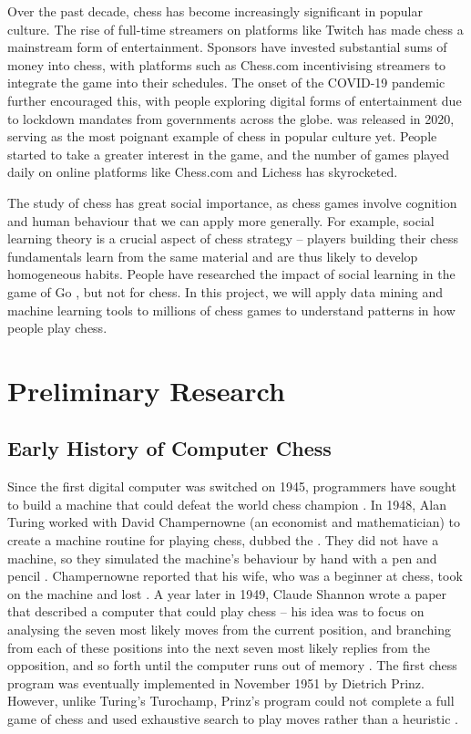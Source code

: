 \documentclass[%
 superscriptaddress,
showpacs,preprintnumbers,
 amsmath,
 amssymb,
 aps,
 pra,
showkeys,
onecolumn,
notitlepage,
11pt,
tightenlines      %
]{revtex4-1}
\begin{document}
Over the past decade, chess has become increasingly significant in popular culture. The rise of full-time streamers on platforms like Twitch has made chess a mainstream form of entertainment. Sponsors have invested substantial sums of money into chess, with platforms such as Chess.com incentivising streamers to integrate the game into their schedules. The onset of the COVID-19 pandemic further encouraged this, with people exploring digital forms of entertainment due to lockdown mandates from governments across the globe.  was released in 2020, serving as the most poignant example of chess in popular culture yet. People started to take a greater interest in the game, and the number of games played daily on online platforms like Chess.com and Lichess has skyrocketed. 

The study of chess has great social importance, as chess games involve cognition and human behaviour that we can apply more generally. For example, social learning theory is a crucial aspect of chess strategy -- players building their chess fundamentals learn from the same material and are thus likely to develop homogeneous habits. People have researched the impact of social learning in the game of Go \cite{beheim2014strategic}, but not for chess. In this project, we will apply data mining and machine learning tools to millions of chess games to understand patterns in how people play chess.

\section{Preliminary Research}

\subsection{Early History of Computer Chess}
Since the first digital computer was switched on 1945, programmers have sought to build a machine that could defeat the world chess champion \cite{earlyComputerChessHistory}. In 1948, Alan Turing worked with David Champernowne (an economist and mathematician) to create a machine routine for playing chess, dubbed the  \cite{copeland2005turing}. They did not have a machine, so they simulated the machine's behaviour by hand with a pen and pencil \cite{copeland2005turing}. Champernowne reported that his wife, who was a beginner at chess, took on the machine and lost \cite{copeland2005turing}. A year later in 1949, Claude Shannon wrote a paper that described a computer that could play chess -- his idea was to focus on analysing the seven most likely moves from the current position, and branching from each of these positions into the next seven most likely replies from the opposition, and so forth until the computer runs out of memory \cite{shannon1950xxii}. The first chess program was eventually implemented in November 1951 by Dietrich Prinz. However, unlike Turing's Turochamp, Prinz's program could not complete a full game of chess and used exhaustive search to play moves rather than a heuristic \cite{copeland2005turing}.
\end{document}
